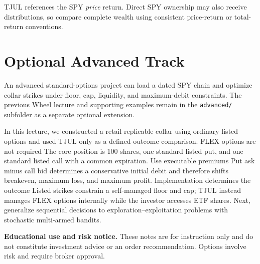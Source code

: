 \documentclass[11pt]{article}
\begin{document}
TJUL references the SPY \emph{price} return. Direct SPY ownership may also
receive distributions, so compare complete wealth using consistent price-return
or total-return conventions.

\section{Optional Advanced Track}

An advanced standard-options project can load a dated SPY chain and optimize
collar strikes under floor, cap, liquidity, and maximum-debit constraints. The
previous Wheel lecture and supporting examples remain in the \texttt{advanced/}
subfolder as a separate optional extension.

\Needspace{0.34\textheight}
\keytakeaways
  {In this lecture, we constructed a retail-replicable collar using ordinary listed options and used TJUL only as a defined-outcome comparison.}
  {FLEX options are not required}
  {The core position is 100 shares, one standard listed put, and one standard listed call with a common expiration.}
  {Use executable premiums}
  {Put ask minus call bid determines a conservative initial debit and therefore shifts breakeven, maximum loss, and maximum profit.}
  {Implementation determines the outcome}
  {Listed strikes constrain a self-managed floor and cap; TJUL instead manages FLEX options internally while the investor accesses ETF shares.}
  {Next, generalize sequential decisions to exploration--exploitation problems with stochastic multi-armed bandits.}

\vfill
{\sffamily\footnotesize\color{vnmuted}\textbf{Educational use and risk notice.}
These notes are for instruction only and do not constitute investment advice or
an order recommendation. Options involve risk and require broker approval.}
\end{document}
